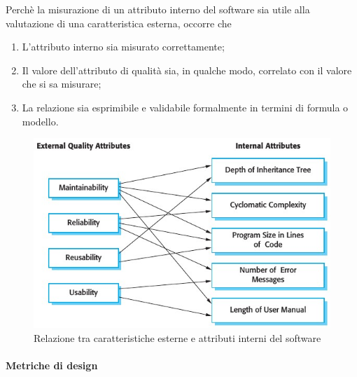 Perchè la misurazione di un attributo interno del software sia utile alla
valutazione di una caratteristica esterna, occorre che

\begin{enumerate}
  \item L'attributo interno sia misurato correttamente;
  \item Il valore dell'attributo di qualità sia, in qualche modo, correlato con
    il valore che si sa misurare;
  \item La relazione sia esprimibile e validabile formalmente in termini di
    formula o modello.
\end{enumerate}

\begin{figure}[h]
  \centering
  \includegraphics[scale=0.6]{imgs/int_ext_attrib.jpg}
  \caption{Relazione tra caratteristiche esterne e attributi interni del
    software}
\end{figure}

\paragraph{Metriche di design}
\label{par:metriche_di_design}

